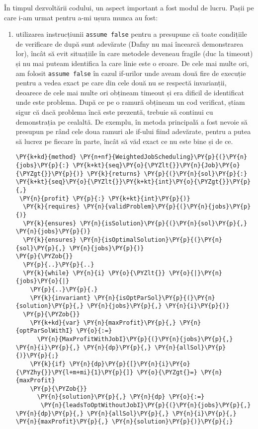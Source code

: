 În timpul dezvoltării codului, un aspect important a fost modul de lucru. Pașii pe care i-am urmat pentru a-mi ușura munca au fost:
\begin{enumerate}
    \item utilizarea instrucțiunii \texttt{assume false} pentru a presupune că toate condițiile de verificare de după sunt adevărate (Dafny nu mai încearcă demonstrarea lor), încât să evit situațiile în care metodele deveneau fragile (duc la timeout) și nu mai puteam identifica la care linie este o eroare. 
    De cele mai multe ori, am folosit \texttt{assume false} în cazul if-urilor unde aveam două fire de execuție pentru a vedea exact pe care din cele două nu se respectă invarianții, deoarece de cele mai multe ori obțineam timeout și era dificil de identificat unde este problema. După ce pe o ramură obțineam un cod verificat, știam sigur că dacă problema încă este prezentă, trebuie să continui cu demonstrația pe cealaltă.
    De exemplu, în metoda principală a fost nevoie să presupun pe rând cele doua ramuri ale if-ului fiind adevărate, pentru a putea să lucrez pe fiecare în parte, încât să văd exact ce nu este bine și de ce.
    \begin{Verbatim}[commandchars=\\\{\}, fontsize=\footnotesize]
\PY{k+kd}{method} \PY{n+nf}{WeightedJobScheduling}\PY{p}{(}\PY{n}{jobs}\PY{p}{:} \PY{k+kt}{seq}\PY{o}{\PYZlt{}}\PY{n}{Job}\PY{o}{\PYZgt{}}\PY{p}{)} \PY{k}{returns} \PY{p}{(}\PY{n}{sol}\PY{p}{:} \PY{k+kt}{seq}\PY{o}{\PYZlt{}}\PY{k+kt}{int}\PY{o}{\PYZgt{}}\PY{p}{,}
 \PY{n}{profit} \PY{p}{:} \PY{k+kt}{int}\PY{p}{)}
  \PY{k}{requires} \PY{n}{validProblem}\PY{p}{(}\PY{n}{jobs}\PY{p}{)}
  \PY{k}{ensures} \PY{n}{isSolution}\PY{p}{(}\PY{n}{sol}\PY{p}{,} \PY{n}{jobs}\PY{p}{)}
  \PY{k}{ensures} \PY{n}{isOptimalSolution}\PY{p}{(}\PY{n}{sol}\PY{p}{,} \PY{n}{jobs}\PY{p}{)}
\PY{p}{\PYZob{}}
  \PY{p}{..}\PY{p}{..}
  \PY{k}{while} \PY{n}{i} \PY{o}{\PYZlt{}} \PY{o}{|}\PY{n}{jobs}\PY{o}{|}
    \PY{p}{..}\PY{p}{.}
    \PY{k}{invariant} \PY{n}{isOptParSol}\PY{p}{(}\PY{n}{solution}\PY{p}{,} \PY{n}{jobs}\PY{p}{,} \PY{n}{i}\PY{p}{)}
  \PY{p}{\PYZob{}}
    \PY{k+kd}{var} \PY{n}{maxProfit}\PY{p}{,} \PY{n}{optParSolWithI} \PY{o}{:=}
      \PY{n}{MaxProfitWithJobI}\PY{p}{(}\PY{n}{jobs}\PY{p}{,} \PY{n}{i}\PY{p}{,} \PY{n}{dp}\PY{p}{,} \PY{n}{allSol}\PY{p}{)}\PY{p}{;}
    \PY{k}{if} \PY{n}{dp}\PY{p}{[}\PY{n}{i}\PY{o}{\PYZhy{}}\PY{l+m+mi}{1}\PY{p}{]} \PY{o}{\PYZgt{}=} \PY{n}{maxProfit} 
    \PY{p}{\PYZob{}}
      \PY{n}{solution}\PY{p}{,} \PY{n}{dp} \PY{o}{:=}
       \PY{n}{leadsToOptWithoutJobI}\PY{p}{(}\PY{n}{jobs}\PY{p}{,} \PY{n}{dp}\PY{p}{,} \PY{n}{allSol}\PY{p}{,} \PY{n}{i}\PY{p}{,} \PY{n}{maxProfit}\PY{p}{,} \PY{n}{solution}\PY{p}{)}\PY{p}{;}

\end{Verbatim}
\end{enumerate}
